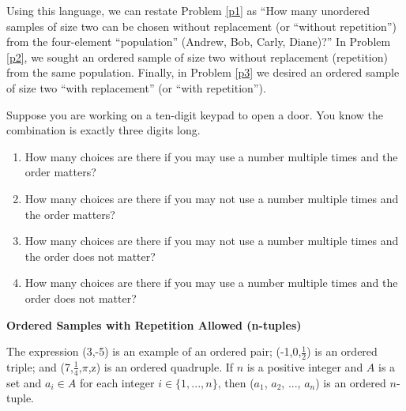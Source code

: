 Using this language, we can restate Problem \ref{p1} as ``How many unordered samples of size two can be chosen without replacement (or ``without repetition'') from the four-element ``population'' (Andrew, Bob, Carly, Diane)?''  In Problem \ref{p2}, we sought an ordered sample of size two without replacement (repetition) from the same population.  Finally, in Problem \ref{p3} we desired an ordered sample of size two ``with replacement'' (or ``with repetition'').

\begin{expl}
Suppose you are working on a ten-digit keypad to open a door.  You know the combination is exactly three digits long.
\begin{annotation}
\end{annotation}
\begin{enumerate}
\item  How many choices are there if you may use a number multiple times and the order matters?
\item  How many choices are there if you may not use a number multiple times and the order matters?
\item  How many choices are there if you may  not use a number multiple times and the order does not matter?
\item  How many choices are there if you may use a number multiple times and the order does not matter?
\end{enumerate}
\end{expl}

\noindent
\textbf{Ordered Samples with Repetition Allowed (n-tuples)}

The expression (3,-5) is an example of an ordered pair; (-1,0,$\frac{1}{2}$) is an ordered triple; and (7,$\frac{1}{4}$,$\pi$,z) is an ordered quadruple.  If $n$ is a positive integer and $A$ is a set and $a_i \in A$ for each integer $i \in \{1,...,n\}$, then ($a_1$, $a_2$, ..., $a_n$) is an ordered
$n$-tuple.

